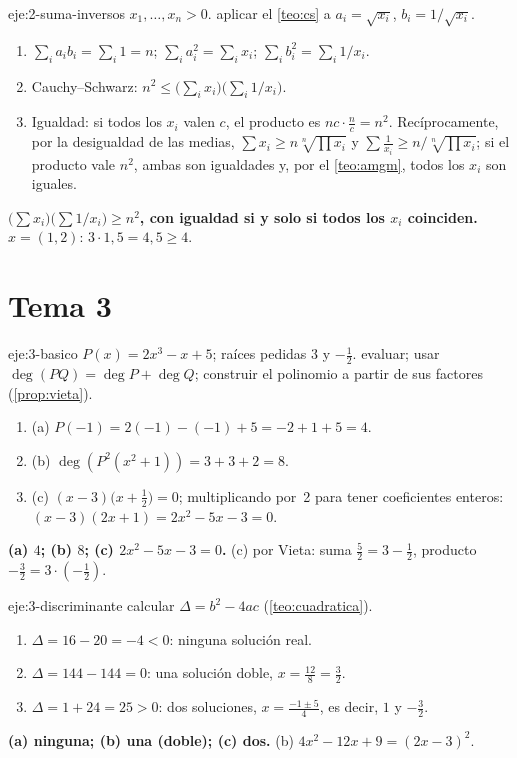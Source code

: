 \begin{solucion}{eje:2-suma-inversos}
\datos $x_1,\dots,x_n>0$.
\planteamiento aplicar el \cref{teo:cs} a $a_i=\sqrt{x_i}$, $b_i=1/\sqrt{x_i}$.
\pasos
\begin{enumerate}[label=\arabic*.]
  \item $\sum_ia_ib_i=\sum_i1=n$; $\sum_ia_i^2=\sum_ix_i$; $\sum_ib_i^2=\sum_i1/x_i$.
  \item Cauchy--Schwarz: $n^2\le\bigl(\sum_ix_i\bigr)\bigl(\sum_i1/x_i\bigr)$.
  \item Igualdad: si todos los $x_i$ valen $c$, el producto es $nc\cdot\frac nc=n^2$. Recíprocamente, por la desigualdad de las medias, $\sum x_i\ge n\sqrt[n]{\prod x_i}$ y $\sum\frac1{x_i}\ge n\big/\sqrt[n]{\prod x_i}$; si el producto vale $n^2$, ambas son igualdades y, por el \cref{teo:amgm}, todos los $x_i$ son iguales.
\end{enumerate}
\resultado \textbf{$\bigl(\sum x_i\bigr)\bigl(\sum 1/x_i\bigr)\ge n^2$, con igualdad si y solo si todos los $x_i$ coinciden.}
\comprobacion $x=(1,2)$: $3\cdot1{,}5=4{,}5\ge4$.
\end{solucion}
\section{Tema 3}

\begin{solucion}{eje:3-basico}
\datos $P(x)=2x^3-x+5$; raíces pedidas $3$ y $-\frac12$.
\planteamiento evaluar; usar $\deg(PQ)=\deg P+\deg Q$; construir el polinomio a partir de sus factores (\cref{prop:vieta}).
\pasos
\begin{enumerate}[label=\arabic*.]
  \item (a) $P(-1)=2(-1)-(-1)+5=-2+1+5=4$.
  \item (b) $\deg(P^2(x^2+1))=3+3+2=8$.
  \item (c) $(x-3)\bigl(x+\frac12\bigr)=0$; multiplicando por~2 para tener coeficientes enteros: $(x-3)(2x+1)=2x^2-5x-3=0$.
\end{enumerate}
\resultado \textbf{(a) $4$; (b) $8$; (c) $2x^2-5x-3=0$.}
\comprobacion (c) por Vieta: suma $\frac52=3-\frac12$, producto $-\frac32=3\cdot(-\frac12)$.
\end{solucion}

\begin{solucion}{eje:3-discriminante}
\planteamiento calcular $\Delta=b^2-4ac$ (\cref{teo:cuadratica}).
\pasos
\begin{enumerate}[label=(\alph*)]
  \item $\Delta=16-20=-4<0$: ninguna solución real.
  \item $\Delta=144-144=0$: una solución doble, $x=\frac{12}8=\frac32$.
  \item $\Delta=1+24=25>0$: dos soluciones, $x=\frac{-1\pm5}{4}$, es decir, $1$ y $-\frac32$.
\end{enumerate}
\resultado \textbf{(a) ninguna; (b) una (doble); (c) dos.}
\comprobacion (b) $4x^2-12x+9=(2x-3)^2$.
\end{solucion}

